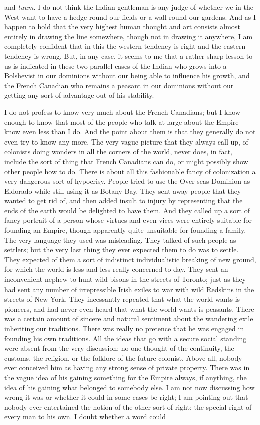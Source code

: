 \documentclass{book}
\begin{document}
and \emph{tuum.} I do not think the Indian gentleman is any judge of whether we in the West want to have a hedge round our fields or a wall round our gardens. And as I happen to hold that the very highest human thought and art consists almost entirely in drawing the line somewhere, though not in drawing it anywhere, I am completely confident that in this the western tendency is right and the eastern tendency is wrong. But, in any case, it seems to me that a rather sharp lesson to us is indicated in these two parallel cases of the Indian who grows into a Bolshevist in our dominions without our being able to influence his growth, and the French Canadian who remains a peasant in our dominions without our getting any sort of advantage out of his stability.

I do not profess to know very much about the French Canadians; but I know enough to know that most of the people who talk at large about the Empire know even less than I do. And the point about them is that they generally do not even try to know any more. The very vague picture that they always call up, of colonists doing wonders in all the corners of the world, never does, in fact, include the sort of thing that French Canadians can do, or might possibly show other people how to do. There is about all this fashionable fancy of colonization a very dangerous sort of hypocrisy. People tried to use the Over-seas Dominion as Eldorado while still using it as Botany Bay. They sent away people that they wanted to get rid of, and then added insult to injury by representing that the ends of the earth would be delighted to have them. And they called up a sort of fancy portrait of a person whose virtues and even vices were entirely suitable for founding an Empire, though apparently quite unsuitable for founding a family. The very language they used was misleading. They talked of such people as settlers; but the very last thing they ever expected them to do was to settle. They expected of them a sort of indistinct individualistic breaking of new ground, for which the world is less and less really concerned to-day. They sent an inconvenient nephew to hunt wild bisons in the streets of Toronto; just as they had sent any number of irrepressible Irish exiles to war with wild Redskins in the streets of New York. They incessantly repeated that what the world wants is pioneers, and had never even heard that what the world wants is peasants. There was a certain amount of sincere and natural sentiment about the wandering exile inheriting our traditions. There was really no pretence that he was engaged in founding his own traditions. All the ideas that go with a secure social standing were absent from the very discussion; no one thought of the continuity, the customs, the religion, or the folklore of the future colonist. Above all, nobody ever conceived him as having any strong sense of private property. There was in the vague idea of his gaining something for the Empire always, if anything, the idea of his gaining what belonged to somebody else. I am not now discussing how wrong it was or whether it could in some cases be right; I am pointing out that nobody ever entertained the notion of the other sort of right; the special right of every man to his own. I doubt whether a word could 
\end{document}
